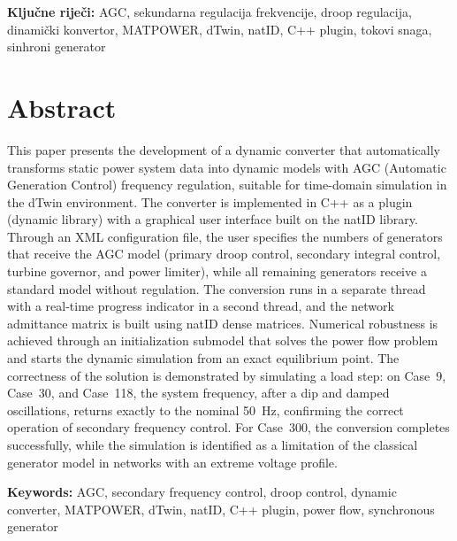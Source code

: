 \documentclass[12pt,oneside, a4paper]{book}
\begin{document}
\vspace{0.3cm}
\noindent\textbf{Ključne riječi:} AGC, sekundarna regulacija frekvencije,
droop regulacija, dinamički konvertor, MATPOWER, dTwin, natID, C++ plugin,
tokovi snaga, sinhroni generator

\vspace{0.8cm}

\section*{Abstract}

This paper presents the development of a dynamic converter that
automatically transforms static power system data 
into dynamic models with AGC (Automatic Generation Control) frequency
regulation, suitable for time-domain simulation in the dTwin environment.
The converter is implemented in C++ as a plugin (dynamic library) with a
graphical user interface built on the natID library. Through an XML
configuration file, the user specifies the numbers of generators that
receive the AGC model (primary droop control, secondary integral control,
turbine governor, and power limiter), while all remaining generators receive
a standard model without regulation. The conversion runs in a separate
thread with a real-time progress indicator in a second thread, and the
network admittance matrix is built using natID dense matrices. Numerical
robustness is achieved through an initialization submodel that solves the
power flow problem and starts the dynamic simulation from an exact
equilibrium point. The correctness of the solution is demonstrated by
simulating a load step: on Case~9, Case~30, and Case~118, the system
frequency, after a dip and damped oscillations, returns exactly to the
nominal 50~Hz, confirming the correct operation of secondary frequency
control. For Case~300, the conversion completes successfully, while the
simulation is identified as a limitation of the classical generator model
in networks with an extreme voltage profile.

\vspace{0.3cm}
\noindent\textbf{Keywords:} AGC, secondary frequency control, droop control,
dynamic converter, MATPOWER, dTwin, natID, C++ plugin, power flow, synchronous generator


\tableofcontents
\listoffigures
{}

\newpage 
\cleardoublepage %
\pagestyle{fancyplain} %
\end{document}
